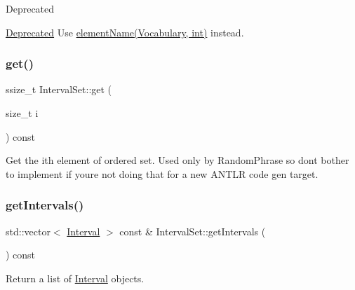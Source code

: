 \begin{DoxyRefDesc}{Deprecated}
\item[\hyperlink{deprecated__deprecated000009}{Deprecated}]Use \hyperlink{}{element\+Name(\+Vocabulary, int)} instead. \end{DoxyRefDesc}
\mbox{\label{classantlr4_1_1misc_1_1IntervalSet_a71e9df51ea033526f7efd519841da32e}} 
\subsubsection{\texorpdfstring{get()}{get()}}
{\footnotesize\ttfamily ssize\+\_\+t Interval\+Set\+::get (\begin{DoxyParamCaption}\item[{size\+\_\+t}]{i }\end{DoxyParamCaption}) const}

Get the ith element of ordered set. Used only by Random\+Phrase so don\textquotesingle{}t bother to implement if you\textquotesingle{}re not doing that for a new A\+N\+T\+LR code gen target. \mbox{\label{classantlr4_1_1misc_1_1IntervalSet_ae0f5e60d4c0a59d259fed37e24ff96bc}} 
\subsubsection{\texorpdfstring{get\+Intervals()}{getIntervals()}}
{\footnotesize\ttfamily std\+::vector$<$ \hyperlink{classantlr4_1_1misc_1_1Interval}{Interval} $>$ const  \& Interval\+Set\+::get\+Intervals (\begin{DoxyParamCaption}{ }\end{DoxyParamCaption}) const}



Return a list of \hyperlink{classantlr4_1_1misc_1_1Interval}{Interval} objects. 

\mbox{\label{classantlr4_1_1misc_1_1IntervalSet_a6f95bbd9eef0e87e637600c60ca65a6f}} 
